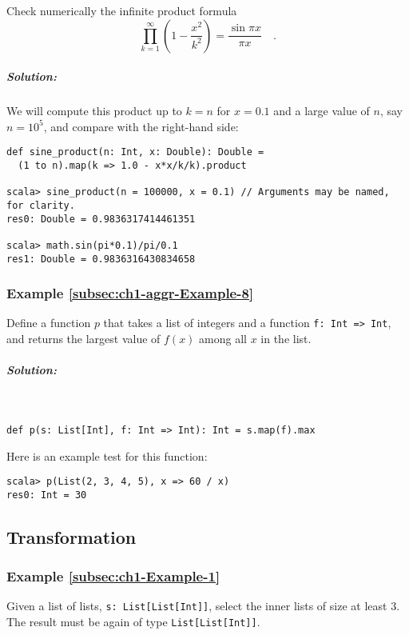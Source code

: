 Check numerically the infinite product formula
\[
\prod_{k=1}^{\infty}\left(1-\frac{x^{2}}{k^{2}}\right)=\frac{\sin\pi x}{\pi x}\quad.
\]


\subparagraph{Solution:}

We will compute this product up to $k=n$ for $x=0.1$ and a large
value of $n$, say $n=10^{5}$, and compare with the right-hand side:
\begin{lstlisting}
def sine_product(n: Int, x: Double): Double =
  (1 to n).map(k => 1.0 - x*x/k/k).product

scala> sine_product(n = 100000, x = 0.1) // Arguments may be named, for clarity.
res0: Double = 0.9836317414461351

scala> math.sin(pi*0.1)/pi/0.1
res1: Double = 0.9836316430834658
\end{lstlisting}

\subsubsection{Example \label{subsec:ch1-aggr-Example-8}\ref{subsec:ch1-aggr-Example-8}}

Define a function $p$ that takes a list of integers and a function
\lstinline!f: Int => Int!,
and returns the largest value of $f(x)$ among all $x$ in the list.

\subparagraph{Solution:}

~

\begin{lstlisting}
def p(s: List[Int], f: Int => Int): Int = s.map(f).max
\end{lstlisting}
Here is an example test for this function:
\begin{lstlisting}
scala> p(List(2, 3, 4, 5), x => 60 / x)
res0: Int = 30
\end{lstlisting}

\subsection{Transformation}

\subsubsection{Example \label{subsec:ch1-Example-1}\ref{subsec:ch1-Example-1}}

Given a list of lists, \lstinline!s: List[List[Int]]!,
select the inner lists of size at least $3$. The result must be again
of type \lstinline!List[List[Int]]!. 

